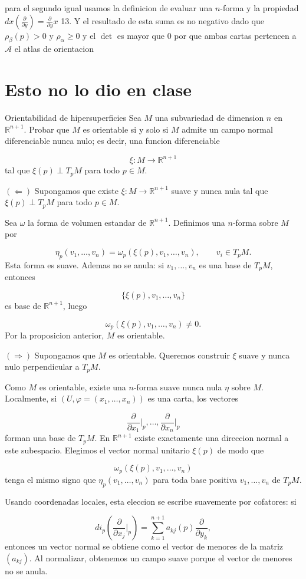\begin{bookproof}{}
\[\]
para el segundo igual usamos la definicion de evaluar una $n$-forma y la propiedad $dx(\frac{\partial }{\partial y})=\frac{\partial }{\partial y}x$ 13. Y el resultado de esta suma es no negativo dado que $\rho_{\beta}(p)>0$ y $\rho_{\alpha }\geq 0$ y el $\det$ es mayor que $0$ por que ambas cartas pertencen a $\mathcal A$ el atlas de orientacion

\bookqed
\end{bookproof}
\section{Esto no lo dio en clase}
\begin{booktheorem}{Orientabilidad de hipersuperficies}
Sea $M$ una subvariedad de dimension $n$ en $\mathbb R^{n+1}$. Probar que $M$ es orientable si y solo si $M$ admite un campo normal diferenciable nunca nulo; es decir, una funcion diferenciable

\[
\xi:M\to\mathbb R^{n+1}
\]
tal que $\xi(p)\perp T_pM$ para todo $p\in M$.

\end{booktheorem}
\begin{bookproof}{}
\textbf{$(\Leftarrow)$} Supongamos que existe $\xi:M\to\mathbb R^{n+1}$ suave y nunca nula tal que $\xi(p)\perp T_pM$ para todo $p\in M$.

Sea $\omega$ la forma de volumen estandar de $\mathbb R^{n+1}$. Definimos una $n$-forma sobre $M$ por

\[
\eta_p(v_1,\ldots,v_n)=\omega_p(\xi(p),v_1,\ldots,v_n),\qquad v_i\in T_pM.
\]
Esta forma es suave. Ademas no se anula: si $v_1,\ldots,v_n$ es una base de $T_pM$, entonces

\[
\{\xi(p),v_1,\ldots,v_n\}
\]
es base de $\mathbb R^{n+1}$, luego

\[
\omega_p(\xi(p),v_1,\ldots,v_n)\ne0.
\]
Por la proposicion anterior, $M$ es orientable.

\textbf{$(\Rightarrow)$} Supongamos que $M$ es orientable. Queremos construir $\xi$ suave y nunca nulo perpendicular a $T_pM$.

Como $M$ es orientable, existe una $n$-forma suave nunca nula $\eta$ sobre $M$. Localmente, si $(U,\varphi=(x_1,\ldots,x_n))$ es una carta, los vectores

\[
\frac{\partial}{\partial x_1}\bigg|_p,\ldots,\frac{\partial}{\partial x_n}\bigg|_p
\]
forman una base de $T_pM$. En $\mathbb R^{n+1}$ existe exactamente una direccion normal a este subespacio. Elegimos el vector normal unitario $\xi(p)$ de modo que

\[
\omega_p(\xi(p),v_1,\ldots,v_n)
\]
tenga el mismo signo que $\eta_p(v_1,\ldots,v_n)$ para toda base positiva $v_1,\ldots,v_n$ de $T_pM$.

Usando coordenadas locales, esta eleccion se escribe suavemente por cofatores: si

\[
d i_p\left(\frac{\partial}{\partial x_j}\bigg|_p\right)
=\sum_{k=1}^{n+1}a_{kj}(p)\frac{\partial}{\partial y_k},
\]
entonces un vector normal se obtiene como el vector de menores de la matriz $(a_{kj})$. Al normalizar, obtenemos un campo suave porque el vector de menores no se anula.

\bookqed
\end{bookproof}
